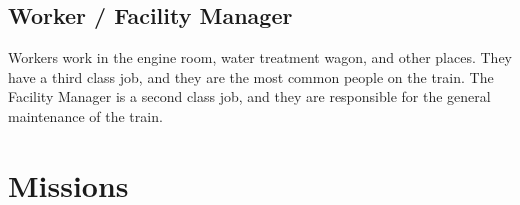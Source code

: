 \subsection{Worker / Facility Manager}

Workers work in the engine room, water treatment wagon, and other places.
They have a third class job, and they are the most common people on the train.
The Facility Manager is a second class job, and they are responsible for the general maintenance of the train.

\section{Missions}
